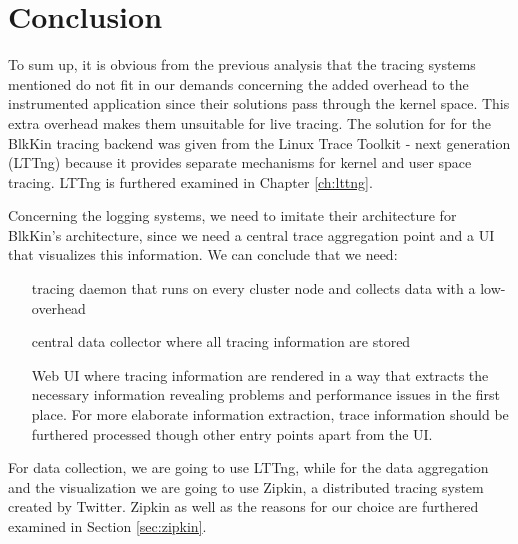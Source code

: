 \section{Conclusion}
To sum up, it is obvious from the previous analysis that the tracing systems
mentioned do not fit in our demands concerning the added overhead to the
instrumented application since their solutions pass through the kernel space.
This extra overhead makes them unsuitable for live tracing. The solution for
for the BlkKin tracing backend was given from the Linux Trace Toolkit - next
generation (LTTng) because it provides separate mechanisms for kernel and user
space tracing. LTTng is furthered examined in Chapter \ref{ch:lttng}.

Concerning the logging systems, we need to imitate their architecture for
BlkKin's architecture, since we need a central trace aggregation point and a UI
that visualizes this information. We can conclude that we need:
\begin{itemize}
\item[tracing daemon] that runs on every cluster node and collects data with a
low-overhead
\item[central data collector] where all tracing information are stored
\item[Web UI] where tracing information are rendered in a way that extracts the
necessary information revealing problems and performance issues in the first
place. For more elaborate information extraction, trace information should be
furthered processed though other entry points apart from the UI.  
\end{itemize}
For data collection, we are going to use LTTng, while for the data aggregation
and the visualization we are going to use Zipkin, a distributed tracing system
created by Twitter. Zipkin as well as the reasons for our choice are furthered
examined in Section \ref{sec:zipkin}.

